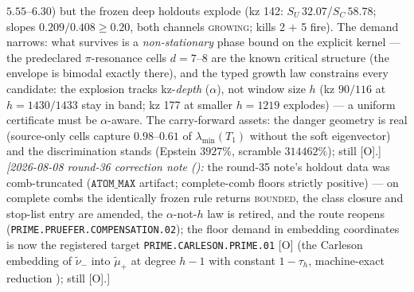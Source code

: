 \documentclass[11pt,a4paper]{article}
\begin{document}
{$5.55$--$6.30$) but the frozen deep holdouts explode (kz 142:
$S_U\,32.07$/$S_C\,58.78$; slopes $0.209/0.408 \ge 0.20$, both
channels \textsc{growing}; kills 2 $+$ 5 fire).  The demand
narrows: what survives is a \emph{non-stationary} phase bound on
the explicit kernel --- the predeclared $\pi$-resonance cells
$d = 7$--$8$ are the known critical structure (the envelope is
bimodal exactly there), and the typed growth law constrains
every candidate: the explosion tracks kz-\emph{depth} ($\alpha$),
not window size $h$ (kz $90/116$ at $h = 1430/1433$ stay in
band; kz 177 at smaller $h = 1219$ explodes) --- a uniform
certificate must be $\alpha$-aware.  The carry-forward assets:
the danger geometry is real (source-only cells capture
$0.98$--$0.61$ of $\lambda_{\min}(T_1)$ without the soft
eigenvector) and the discrimination stands (Epstein $3927\%$,
scramble $314462\%$); still [O].]
\emph{[2026-08-08 round-36 correction note
():} the round-35 note's
holdout data was comb-truncated ($\texttt{ATOM\_MAX}$ artifact;
complete-comb floors strictly positive) --- on complete combs
the identically frozen rule returns \textsc{bounded}, the class
closure and stop-list entry are amended, the $\alpha$-not-$h$
law is retired, and the route reopens
(\texttt{PRIME.PRUEFER.COMPENSATION.02}); the floor demand in
embedding coordinates is now the registered target
\texttt{PRIME.CARLESON.PRIME.01} [O] (the Carleson embedding of
$\tilde\nu_-$ into $\tilde\mu_+$ at degree $h{-}1$ with constant
$1 - \tau_h$, machine-exact reduction
); still [O].]\par}
\end{document}
